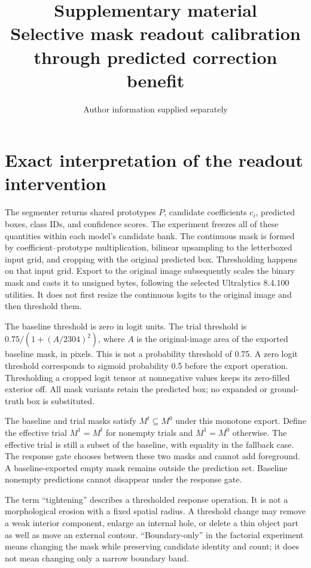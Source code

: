 \documentclass[11pt,a4paper]{article}
\title{Supplementary material\\\large Selective mask readout calibration through predicted correction benefit}
\author{Author information supplied separately}
\date{}
\begin{document}
\maketitle

\section{Exact interpretation of the readout intervention}
The segmenter returns shared prototypes $P$, candidate coefficients $c_i$, predicted boxes, class IDs, and confidence scores. The experiment freezes all of these quantities within each model's candidate bank. The continuous mask is formed by coefficient--prototype multiplication, bilinear upsampling to the letterboxed input grid, and cropping with the original predicted box. Thresholding happens on that input grid. Export to the original image subsequently scales the binary mask and casts it to unsigned bytes, following the selected Ultralytics 8.4.100 utilities. It does not first resize the continuous logits to the original image and then threshold them.

The baseline threshold is zero in logit units. The trial threshold is $0.75/(1+(A/2304)^2)$, where $A$ is the original-image area of the exported baseline mask, in pixels. This is not a probability threshold of 0.75. A zero logit threshold corresponds to sigmoid probability 0.5 before the export operation. Thresholding a cropped logit tensor at nonnegative values keeps its zero-filled exterior off. All mask variants retain the predicted box; no expanded or ground-truth box is substituted.

The baseline and trial masks satisfy $M^t\subseteq M^0$ under this monotone export. Define the effective trial $M^1=M^t$ for nonempty trials and $M^1=M^0$ otherwise. The effective trial is still a subset of the baseline, with equality in the fallback case. The response gate chooses between these two masks and cannot add foreground. A baseline-exported empty mask remains outside the prediction set. Baseline nonempty predictions cannot disappear under the response gate.

The term ``tightening'' describes a thresholded response operation. It is not a morphological erosion with a fixed spatial radius. A threshold change may remove a weak interior component, enlarge an internal hole, or delete a thin object part as well as move an external contour. ``Boundary-only'' in the factorial experiment means changing the mask while preserving candidate identity and count; it does not mean changing only a narrow boundary band.
\end{document}
